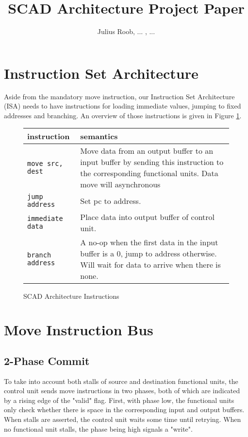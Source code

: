 \documentclass[adraft]{eptcs}
\title{SCAD Architecture Project Paper}
\author{Julius Roob, ...
	\institute{University of Kaiserslautern, Embedded Systems Group}
	\email{julius@juliusroob.de}, ...
}
\begin{document}
	\maketitle \newpage
	\tableofcontents \newpage
	\section{Instruction Set Architecture}
		Aside from the mandatory move instruction, our Instruction Set Architecture (ISA) needs to have instructions for loading immediate values, jumping to fixed addresses and branching.
		An overview of those instructions is given in Figure \ref{fig:instruction_table}.
		
		\begin{figure}[!ht]
			\begin{center}
				\begin{tabular}{| l | p{7cm} |}
					\hline
					\textbf{instruction} & \textbf{semantics} \\ \hline
					\lstinline{move src, dest} & Move data from an output buffer to an input buffer by sending this instruction to the corresponding functional units. Data move will asynchronous \\ \hline
					\lstinline{jump address} & Set pc to address. \\ \hline
					\lstinline{immediate data} & Place data into output buffer of control unit. \\ \hline
					\lstinline{branch address} & A no-op when the first data in the input buffer is a 0, jump to address otherwise. Will wait for data to arrive when there is none. \\ \hline
				\end{tabular}
				\label{fig:instruction_table}
				\caption{SCAD Architecture Instructions}
			\end{center}
		\end{figure}
		
	\section{Move Instruction Bus}
		\subsection{2-Phase Commit}
			To take into account both stalls of source and destination functional units, the control unit sends move instructions in two phases, both of which are indicated by a rising edge of the "valid" flag.
			First, with phase low, the functional units only check whether there is space in the corresponding input and output buffers.
			When stalls are asserted, the control unit waits some time until retrying.
			When no functional unit stalls, the phase being high signals a "write".
			
\end{document}
